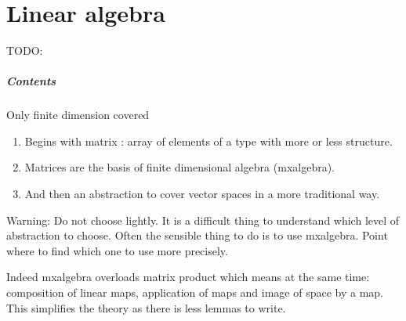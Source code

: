 \chapter{Linear algebra}
\label{linalg:smith}

TODO:

\paragraph{Contents}
Only finite dimension covered

\begin{enumerate}
\item Begins with matrix : array of elements of a type with more or
  less structure.  
\item Matrices are the basis of finite dimensional
  algebra (mxalgebra).
\item   And then an abstraction to cover vector spaces
  in a more traditional way.
\end{enumerate}

Warning: Do not choose lightly. It is a difficult thing to understand
which level of abstraction to choose. Often the sensible thing to do
is to use mxalgebra. Point where to find which one to use more
precisely.

Indeed mxalgebra overloads matrix product which means at the same
time: composition of linear maps, application of maps and image of
space by a map. This simplifies the theory as there is less lemmas to
write.

